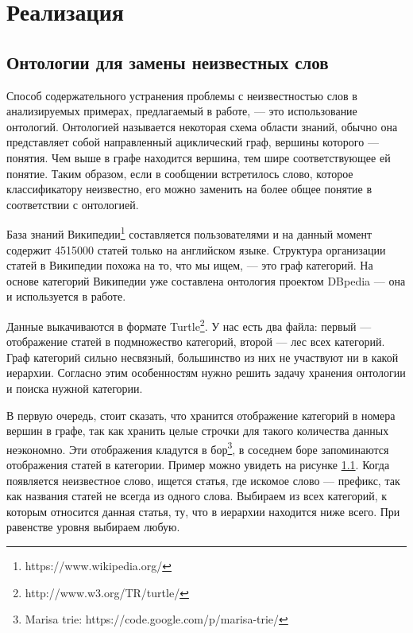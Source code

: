 \section{Реализация}
\subsection{Онтологии для замены неизвестных слов}\label{ontology}
Способ содержательного устранения проблемы с неизвестностью слов в анализируемых примерах,
предлагаемый в работе, --- это использование онтологий. Онтологией называется некоторая схема области
знаний, обычно она представляет собой направленный ациклический граф, вершины которого ---
понятия. Чем выше в графе находится вершина, тем шире соответствующее ей понятие. Таким образом,
если в сообщении встретилось слово, которое классификатору неизвестно, его можно заменить на более
общее понятие в соответствии с онтологией.

База знаний Википедии\footnote{https://www.wikipedia.org/} составляется пользователями и на данный
момент содержит 4515000 статей только на английском языке. Структура организации статей в
Википедии похожа на то, что мы ищем, --- это граф категорий.
На основе категорий Википедии уже составлена онтология проектом DBpedia\cite{dbpedia-swj} --- она и
используется в работе.

Данные выкачиваются в формате
Turtle\footnote{http://www.w3.org/TR/turtle/}. У нас есть два файла: первый --- отображение статей в
подмножество категорий, второй --- лес всех категорий. Граф категорий сильно несвязный, большинство
из них не участвуют ни в какой иерархии. Согласно этим особенностям нужно решить задачу хранения
онтологии и поиска нужной категории.

В первую очередь, стоит сказать, что хранится отображение категорий в номера вершин в графе, так как
хранить целые строчки для такого количества данных неэкономно. Эти отображения кладутся в
бор\footnote{Marisa trie: https://code.google.com/p/marisa-trie/}, в
соседнем боре запоминаются отображения статей в категории. Пример можно увидеть на рисунке \ref{ontology}.
Когда появляется неизвестное слово, ищется статья, где искомое
слово --- префикс, так как названия статей не всегда из одного слова.
Выбираем из всех категорий, к которым относится данная статья, ту, что в иерархии находится ниже всего. При равенстве уровня выбираем любую.

